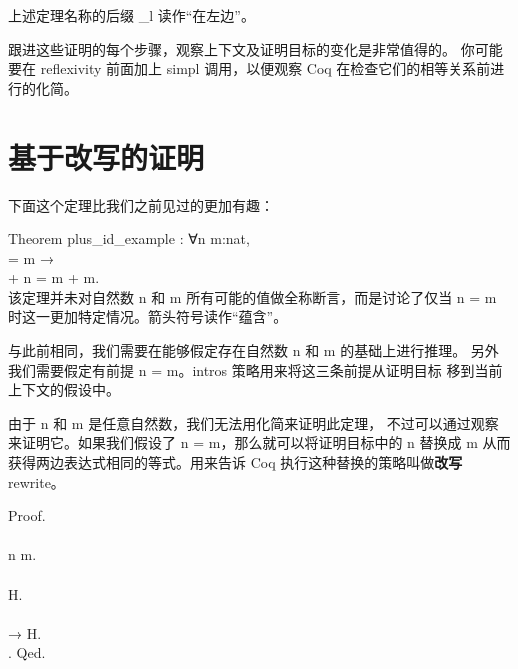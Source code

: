 \documentclass[utf8]{ctexart}
\begin{document}
上述定理名称的后缀 {{\_l}} 读作``在左边''。

跟进这些证明的每个步骤，观察上下文及证明目标的变化是非常值得的。
你可能要在 {{reflexivity}} 前面加上 {{simpl}} 调用，以便观察 Coq
在检查它们的相等关系前进行的化简。

\protect\hypertarget{lab34}{}{}

\hypertarget{ux57faux4e8eux6539ux5199ux7684ux8bc1ux660e}{%
\section{基于改写的证明}\label{ux57faux4e8eux6539ux5199ux7684ux8bc1ux660e}}

下面这个定理比我们之前见过的更加有趣：

{Theorem} {plus\_id\_example} : {∀}{n} {m}:{nat},\\
\hspace*{0.333em}\hspace*{0.333em}{n} = {m} →\\
\hspace*{0.333em}\hspace*{0.333em}{n} + {n} = {m} + {m}.\\

该定理并未对自然数 {{n}} 和 {{m}} 所有可能的值做全称断言，而是讨论了仅当
{{n}} {=} {{m}} 时这一更加特定情况。箭头符号读作``蕴含''。

与此前相同，我们需要在能够假定存在自然数 {{n}} 和 {{m}}
的基础上进行推理。 另外我们需要假定有前提 {{n}} {=} {{m}}。{{intros}}
策略用来将这三条前提从证明目标 移到当前上下文的假设中。

由于 {{n}} 和 {{m}} 是任意自然数，我们无法用化简来证明此定理，
不过可以通过观察来证明它。如果我们假设了 {{n}} {=}
{{m}}，那么就可以将证明目标中的 {{n}} 替换成 {{m}}
从而获得两边表达式相同的等式。用来告诉 Coq
执行这种替换的策略叫做\textbf{改写} {{rewrite}}。

{Proof}.\\
\hspace*{0.333em}\hspace*{0.333em}{(*~将两个量词移到上下文中：~*)}\\
\hspace*{0.333em}\hspace*{0.333em}{intros} {n} {m}.\\
\hspace*{0.333em}\hspace*{0.333em}{(*~将前提移到上下文中：~*)}\\
\hspace*{0.333em}\hspace*{0.333em}{intros} {H}.\\
\hspace*{0.333em}\hspace*{0.333em}{(*~用前提改写目标：~*)}\\
\hspace*{0.333em}\hspace*{0.333em}{rewrite} → {H}.\\
\hspace*{0.333em}\hspace*{0.333em}{reflexivity}. {Qed}.\\
\end{document}
